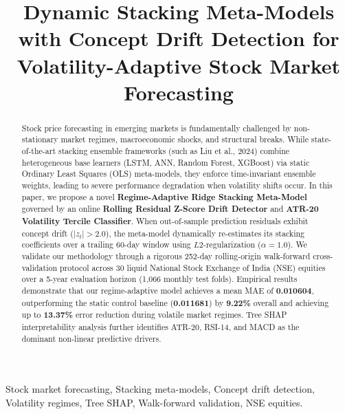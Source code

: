 \documentclass[conference]{IEEEtran}
\begin{document}
\title{Dynamic Stacking Meta-Models with Concept Drift Detection for Volatility-Adaptive Stock Market Forecasting}

\author{
}

\maketitle

\begin{abstract}
Stock price forecasting in emerging markets is fundamentally challenged by non-stationary market regimes, macroeconomic shocks, and structural breaks. While state-of-the-art stacking ensemble frameworks (such as Liu et al., 2024) combine heterogeneous base learners (LSTM, ANN, Random Forest, XGBoost) via static Ordinary Least Squares (OLS) meta-models, they enforce time-invariant ensemble weights, leading to severe performance degradation when volatility shifts occur. In this paper, we propose a novel \textbf{Regime-Adaptive Ridge Stacking Meta-Model} governed by an online \textbf{Rolling Residual Z-Score Drift Detector} and \textbf{ATR-20 Volatility Tercile Classifier}. When out-of-sample prediction residuals exhibit concept drift ($|z_t| > 2.0$), the meta-model dynamically re-estimates its stacking coefficients over a trailing 60-day window using $L2$-regularization ($\alpha = 1.0$). We validate our methodology through a rigorous 252-day rolling-origin walk-forward cross-validation protocol across 30 liquid National Stock Exchange of India (NSE) equities over a 5-year evaluation horizon (1,066 monthly test folds). Empirical results demonstrate that our regime-adaptive model achieves a mean MAE of \textbf{0.010604}, outperforming the static control baseline (\textbf{0.011681}) by \textbf{9.22\%} overall and achieving up to \textbf{13.37\%} error reduction during volatile market regimes. Tree SHAP interpretability analysis further identifies ATR-20, RSI-14, and MACD as the dominant non-linear predictive drivers.
\end{abstract}

\begin{IEEEkeywords}
Stock market forecasting, Stacking meta-models, Concept drift detection, Volatility regimes, Tree SHAP, Walk-forward validation, NSE equities.
\end{IEEEkeywords}
\end{document}
